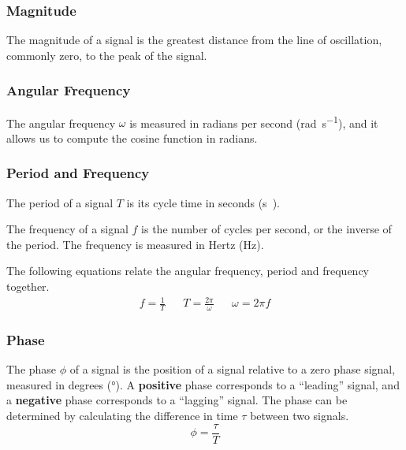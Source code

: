 \documentclass{article}
\begin{document}
\subsubsection{Magnitude}
\begin{definition}
    The magnitude of a signal is the greatest distance from the line of oscillation, commonly zero, 
    to the peak of the signal. 
\end{definition}
\subsubsection{Angular Frequency}
\begin{definition}
    The angular frequency $\omega$ is measured in radians per second (\si{\radian\per\second}), and it allows
    us to compute the cosine function in radians.
\end{definition}
\subsubsection{Period and Frequency}
\begin{definition}[Period]
    The period of a signal $T$ is its cycle time in seconds (\si{\second)}.
\end{definition}
\begin{definition}[Frequency]
    The frequency of a signal $f$ is the number of cycles per second, or 
    the inverse of the period. The frequency is measured in Hertz (\si{\hertz}).
\end{definition}
The following equations relate the angular frequency, period and frequency together.
\begin{align*}
    f = \frac{1}{T} & & T = \frac{2\pi}{\omega} & & \omega = 2 \pi f
\end{align*}
\subsubsection{Phase}
\begin{definition}
    The phase $\phi$ of a signal is the position of a signal relative to a zero phase signal, 
    measured in degrees (\si{\degree}). A \textbf{positive} phase corresponds to a ``leading''
    signal, and a \textbf{negative} phase corresponds to a ``lagging'' signal.
    The phase can be determined by calculating the difference in time $\tau$ between two signals.
    \begin{equation*}
        \phi = \frac{\tau}{T}
    \end{equation*}
\end{definition}
\end{document}
